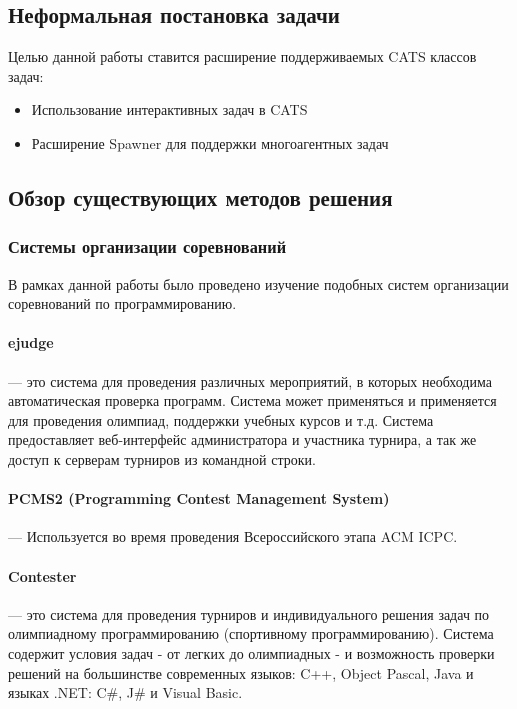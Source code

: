 \documentclass{imcs}
\begin{document}
\FloatBarrier

\subsection{Неформальная постановка задачи}

Целью данной работы ставится расширение поддерживаемых CATS классов задач:
\begin{itemize}
  \item Использование интерактивных задач в CATS
  \item Расширение Spawner для поддержки многоагентных задач
\end{itemize}

\subsection{Обзор существующих методов решения}

\subsubsection{Системы организации соревнований}
В рамках данной работы было проведено изучение подобных систем организации соревнований по программированию.

\paragraph{ejudge} — это система для проведения различных мероприятий, в которых необходима автоматическая проверка программ. Система может применяться и применяется для проведения олимпиад, поддержки учебных курсов и т.д. Система предоставляет веб-интерфейс администратора и участника турнира, а так же доступ к серверам турниров из командной строки. \cite{ejudge}

\paragraph{PCMS2 (Programming Contest Management System)} — Используется во время проведения Всероссийского этапа ACM ICPC. \cite{pcms2}

\paragraph{Contester} — это система для проведения турниров и индивидуального решения задач по олимпиадному программированию (спортивному программированию). Система содержит условия задач - от легких до олимпиадных - и возможность проверки решений на большинстве современных языков: C++, Object Pascal, Java и языках .NET: C\#, J\# и Visual Basic.
\end{document}
